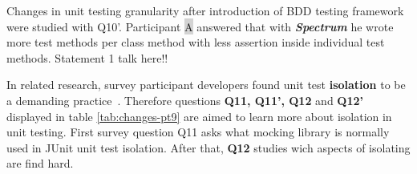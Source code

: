     \begin{table}[H]
             \caption {Unit testing practices and changes in them} \label{tab:changes-pt8}
     \end{table}

Changes in unit testing granularity after introduction of BDD testing framework were studied with Q10'. Participant {\colorbox{lightgray}A}
answered that with \textbf{\textit{Spectrum}} he wrote more test methods per class method with less assertion inside individual
test methods. Statement 1 talk here!!

\clearpage

In related research, survey participant developers found unit test \textbf{isolation} to be a demanding practice~\cite{daka2014survey}.
Therefore questions \textbf{Q11, Q11', Q12} and \textbf{Q12'} displayed in table \ref{tab:changes-pt9} are aimed to learn more about isolation in unit testing.
First survey question Q11 asks what mocking library is normally used in JUnit unit test isolation. After that,
\textbf{Q12} studies wich aspects of isolating are find hard.

